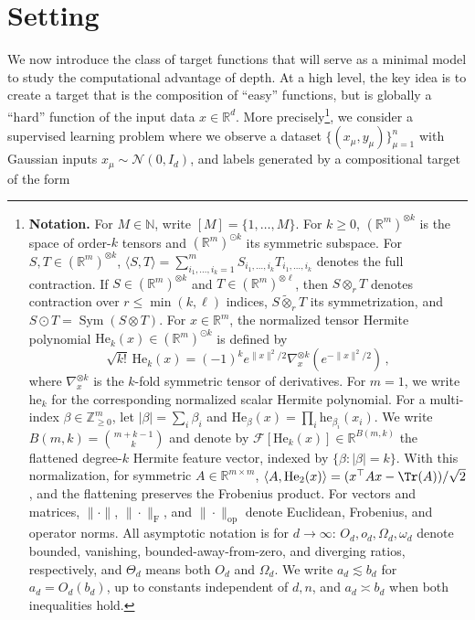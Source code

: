 \documentclass[]{article}
\numberwithin{equation}{section}
\theoremstyle{definition}
\newcommand{\He}{\mathord{\mathrm{He}}}
\newcommand{\he}{\mathord{\mathrm{he}}}
\newcommand{\Sym}{\mathop{\mathrm{Sym}}}
\newcommand{\cF}{\mathcal{F}}
\begin{document}
\section{Setting}
\label{section:setting}
We now introduce the class of target functions that will serve as a minimal model to study the computational advantage of depth. At a high level, the key idea is to create a target that is the composition of ``easy'' functions, but is globally a ``hard'' function of the input data $x\in\mathbb{R}^{d}$. More precisely\footnote{
{\bf Notation.} For $M\in\mathbb N$, write $[M]=\{1,\ldots,M\}$. For $k\ge0$, $(\mathbb R^m)^{\otimes k}$ is the space of order-$k$ tensors and $(\mathbb R^m)^{\odot k}$ its symmetric subspace. For $S,T\in(\mathbb R^m)^{\otimes k}$, $\langle S,T\rangle=\sum_{i_1,\ldots,i_k=1}^m S_{i_1,\ldots,i_k}T_{i_1,\ldots,i_k}$ denotes the full contraction. If $S\in(\mathbb R^m)^{\otimes k}$ and $T\in(\mathbb R^m)^{\otimes \ell}$, then $S\otimes_rT$ denotes contraction over $r\le \min(k,\ell)$ indices, $S\widetilde\otimes_rT$ its symmetrization, and $S\odot T=\Sym(S\otimes T)$. 
For $x\in\mathbb R^m$, the normalized tensor Hermite polynomial $\He_k(x)\in(\mathbb R^m)^{\odot k}$ is defined by 
$$\sqrt{k!}\,\He_k(x)=(-1)^k e^{\|x\|^2/2}\nabla_x^{\otimes k}(e^{-\|x\|^2/2})\, , $$ 
where $\nabla_x^{\otimes k}$ is the $k$-fold symmetric tensor of derivatives. For $m=1$, we write $\he_k$ for the corresponding normalized scalar Hermite polynomial. For a multi-index $\beta\in\mathbb Z_{\ge0}^m$, let $|\beta|=\sum_i\beta_i$ and $\He_\beta(x)=\prod_i \he_{\beta_i}(x_i)$. We write $B(m,k)=\binom{m+k-1}{k}$ and denote by $\cF[\He_k(x)]\in\mathbb R^{B(m,k)}$ the flattened degree-$k$ Hermite feature vector, indexed by $\{\beta:|\beta|=k\}$. With this normalization, for symmetric $A\in\mathbb R^{m\times m}$, $\langle A,\He_2(x)\rangle=(x^\top Ax-\Tr(A))/\sqrt{2}$, and the flattening preserves the Frobenius product. 
For vectors and matrices, $\|\cdot\|$, $\|\cdot\|_{\mathrm F}$, and $\|\cdot\|_{\mathrm{op}}$ denote Euclidean, Frobenius, and operator norms. All asymptotic notation is for $d\to\infty$: $O_d,o_d,\Omega_d,\omega_d$ denote bounded, vanishing, bounded-away-from-zero, and diverging ratios, respectively, and $\Theta_d$ means both $O_d$ and $\Omega_d$. We write $a_d\lesssim b_d$ for $a_d=O_d(b_d)$, up to constants independent of $d,n$, and $a_d\asymp b_d$ when both inequalities hold.

}, we consider a supervised learning problem where we observe a dataset $\{(x_\mu, y_\mu)\}_{\mu=1}^n$ with Gaussian inputs $x_\mu \sim \mathcal{N}(0, I_d)$, and labels generated by a compositional target of the form
\end{document}
